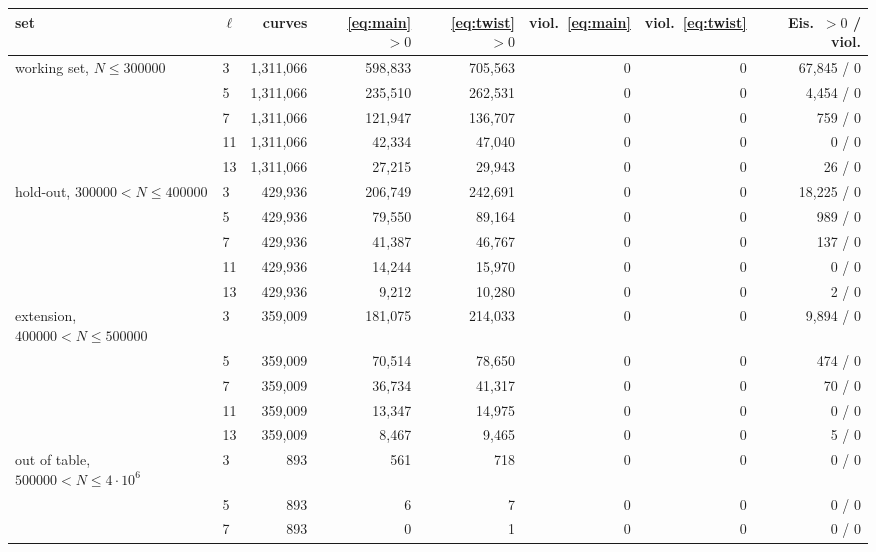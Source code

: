 \begin{tabular}{llrrrrrr}
\hline
set & $\ell$ & curves & \eqref{eq:main} $>0$ & \eqref{eq:twist} $>0$ & viol.\ \eqref{eq:main} & viol.\ \eqref{eq:twist} & Eis.\ $>0$ / viol. \\
\hline
working set, $N \le 300000$ & 3 & 1,311,066 & 598,833 & 705,563 & 0 & 0 & 67,845 / 0 \\
 & 5 & 1,311,066 & 235,510 & 262,531 & 0 & 0 & 4,454 / 0 \\
 & 7 & 1,311,066 & 121,947 & 136,707 & 0 & 0 & 759 / 0 \\
 & 11 & 1,311,066 & 42,334 & 47,040 & 0 & 0 & 0 / 0 \\
 & 13 & 1,311,066 & 27,215 & 29,943 & 0 & 0 & 26 / 0 \\
\hline
hold-out, $300000 < N \le 400000$ & 3 & 429,936 & 206,749 & 242,691 & 0 & 0 & 18,225 / 0 \\
 & 5 & 429,936 & 79,550 & 89,164 & 0 & 0 & 989 / 0 \\
 & 7 & 429,936 & 41,387 & 46,767 & 0 & 0 & 137 / 0 \\
 & 11 & 429,936 & 14,244 & 15,970 & 0 & 0 & 0 / 0 \\
 & 13 & 429,936 & 9,212 & 10,280 & 0 & 0 & 2 / 0 \\
\hline
extension, $400000 < N \le 500000$ & 3 & 359,009 & 181,075 & 214,033 & 0 & 0 & 9,894 / 0 \\
 & 5 & 359,009 & 70,514 & 78,650 & 0 & 0 & 474 / 0 \\
 & 7 & 359,009 & 36,734 & 41,317 & 0 & 0 & 70 / 0 \\
 & 11 & 359,009 & 13,347 & 14,975 & 0 & 0 & 0 / 0 \\
 & 13 & 359,009 & 8,467 & 9,465 & 0 & 0 & 5 / 0 \\
\hline
out of table, $500000 < N \le 4\cdot 10^6$ & 3 & 893 & 561 & 718 & 0 & 0 & 0 / 0 \\
 & 5 & 893 & 6 & 7 & 0 & 0 & 0 / 0 \\
 & 7 & 893 & 0 & 1 & 0 & 0 & 0 / 0 \\
\hline
\end{tabular}
